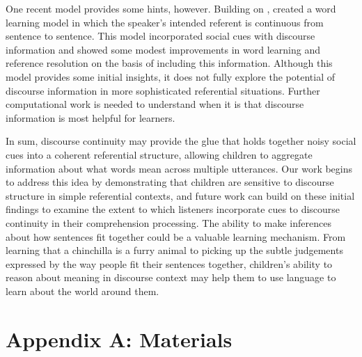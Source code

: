 \documentclass[man]{apa2}
\begin{document}
One recent model provides some hints, however. Building on ,  created a word learning model in which the speaker's intended referent is continuous from sentence to sentence. This model incorporated social cues with discourse information and showed some modest improvements in word learning and reference resolution on the basis of including this information. Although this model provides some initial insights, it does not fully explore the potential of discourse information in more sophisticated referential situations. Further computational work is needed to understand when it is that discourse information is most helpful for learners. 

In sum, discourse continuity may provide the glue that holds together noisy social cues into a coherent referential structure, allowing children to aggregate information about what words mean across multiple utterances.  Our work begins to address this idea by demonstrating that children are sensitive to discourse structure in simple referential contexts, and future work can build on these initial findings to examine the extent to which listeners incorporate cues to discourse continuity in their comprehension processing.  The ability to make inferences about how sentences fit together could be a valuable learning mechanism. From learning that a chinchilla is a furry animal to picking up the subtle judgements expressed by the way people fit their sentences together, children's ability to reason about meaning in discourse context may help them to use language to learn about the world around them. 




\newpage
\theappendix 

\section{Appendix A: Materials}
\end{document}

